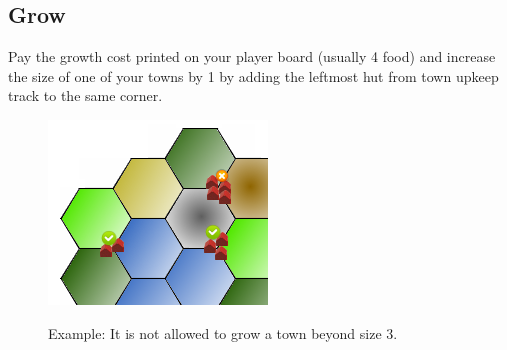 \documentclass[11pt,a4paper,titlepage]{article}
\begin{document}
{{  }\label{subsec:build}
  \subsection{Grow}{
    Pay the growth cost printed on your player board (usually 4 food) and
    increase the size of one of your towns by 1 by adding the leftmost hut
    from town upkeep track to the same corner.
    \begin{figure}[!htb]
      \begin{minipage}[c]{0.2\textwidth}
        \label{fig:tech_irrigation}
        \includegraphics[scale=.6]{doe_example_grow.png}
      \end{minipage}\hfill
      \begin{minipage}[c]{0.4\textwidth}
        \captionsetup{labelformat=empty, justification=justified, singlelinecheck=false}
        \caption{Example: It is not allowed to grow a town beyond size 3.}
      \end{minipage}\hfill
      \label{fig:example_grow}
    \end{figure}
  }\label{subsec:grow}
}\label{sec:player_turn}
\end{document}
